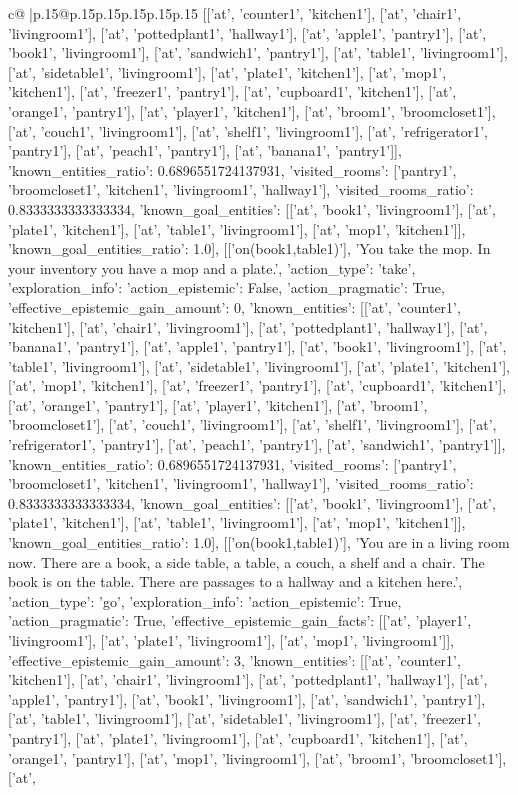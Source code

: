 \documentclass{article}
\begin{document}
{\begin{supertabular}{c@{$\;$}|p{.15\linewidth}@{}p{.15\linewidth}p{.15\linewidth}p{.15\linewidth}p{.15\linewidth}p{.15\linewidth}}
{{{[['at', 'counter1', 'kitchen1'], ['at', 'chair1', 'livingroom1'], ['at', 'pottedplant1', 'hallway1'], ['at', 'apple1', 'pantry1'], ['at', 'book1', 'livingroom1'], ['at', 'sandwich1', 'pantry1'], ['at', 'table1', 'livingroom1'], ['at', 'sidetable1', 'livingroom1'], ['at', 'plate1', 'kitchen1'], ['at', 'mop1', 'kitchen1'], ['at', 'freezer1', 'pantry1'], ['at', 'cupboard1', 'kitchen1'], ['at', 'orange1', 'pantry1'], ['at', 'player1', 'kitchen1'], ['at', 'broom1', 'broomcloset1'], ['at', 'couch1', 'livingroom1'], ['at', 'shelf1', 'livingroom1'], ['at', 'refrigerator1', 'pantry1'], ['at', 'peach1', 'pantry1'], ['at', 'banana1', 'pantry1']], 'known_entities_ratio': 0.6896551724137931, 'visited_rooms': ['pantry1', 'broomcloset1', 'kitchen1', 'livingroom1', 'hallway1'], 'visited_rooms_ratio': 0.8333333333333334, 'known_goal_entities': [['at', 'book1', 'livingroom1'], ['at', 'plate1', 'kitchen1'], ['at', 'table1', 'livingroom1'], ['at', 'mop1', 'kitchen1']], 'known_goal_entities_ratio': 1.0}}], [['on(book1,table1)'], 'You take the mop. In your inventory you have a mop and a plate.', {'action_type': 'take', 'exploration_info': {'action_epistemic': False, 'action_pragmatic': True, 'effective_epistemic_gain_amount': 0, 'known_entities': [['at', 'counter1', 'kitchen1'], ['at', 'chair1', 'livingroom1'], ['at', 'pottedplant1', 'hallway1'], ['at', 'banana1', 'pantry1'], ['at', 'apple1', 'pantry1'], ['at', 'book1', 'livingroom1'], ['at', 'table1', 'livingroom1'], ['at', 'sidetable1', 'livingroom1'], ['at', 'plate1', 'kitchen1'], ['at', 'mop1', 'kitchen1'], ['at', 'freezer1', 'pantry1'], ['at', 'cupboard1', 'kitchen1'], ['at', 'orange1', 'pantry1'], ['at', 'player1', 'kitchen1'], ['at', 'broom1', 'broomcloset1'], ['at', 'couch1', 'livingroom1'], ['at', 'shelf1', 'livingroom1'], ['at', 'refrigerator1', 'pantry1'], ['at', 'peach1', 'pantry1'], ['at', 'sandwich1', 'pantry1']], 'known_entities_ratio': 0.6896551724137931, 'visited_rooms': ['pantry1', 'broomcloset1', 'kitchen1', 'livingroom1', 'hallway1'], 'visited_rooms_ratio': 0.8333333333333334, 'known_goal_entities': [['at', 'book1', 'livingroom1'], ['at', 'plate1', 'kitchen1'], ['at', 'table1', 'livingroom1'], ['at', 'mop1', 'kitchen1']], 'known_goal_entities_ratio': 1.0}}], [['on(book1,table1)'], 'You are in a living room now. There are a book, a side table, a table, a couch, a shelf and a chair. The book is on the table. There are passages to a hallway and a kitchen here.', {'action_type': 'go', 'exploration_info': {'action_epistemic': True, 'action_pragmatic': True, 'effective_epistemic_gain_facts': [['at', 'player1', 'livingroom1'], ['at', 'plate1', 'livingroom1'], ['at', 'mop1', 'livingroom1']], 'effective_epistemic_gain_amount': 3, 'known_entities': [['at', 'counter1', 'kitchen1'], ['at', 'chair1', 'livingroom1'], ['at', 'pottedplant1', 'hallway1'], ['at', 'apple1', 'pantry1'], ['at', 'book1', 'livingroom1'], ['at', 'sandwich1', 'pantry1'], ['at', 'table1', 'livingroom1'], ['at', 'sidetable1', 'livingroom1'], ['at', 'freezer1', 'pantry1'], ['at', 'plate1', 'livingroom1'], ['at', 'cupboard1', 'kitchen1'], ['at', 'orange1', 'pantry1'], ['at', 'mop1', 'livingroom1'], ['at', 'broom1', 'broomcloset1'], ['at', }}}
\end{supertabular}}
\end{document}
